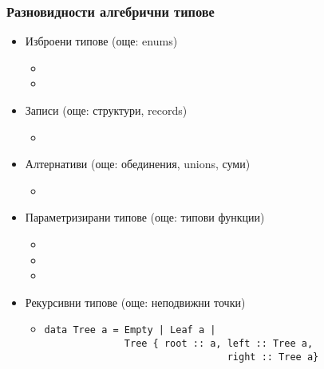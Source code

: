 \documentclass[alsotrans]{beamerswitch}
\begin{document}
\begin{frame}[fragile]
  \frametitle{Разновидности алгебрични типове}
  \small
  \begin{itemize}[<+->]
  \item Изброени типове (още: enums)
    \begin{itemize}
    \item {}
    \item {}
    \end{itemize}
  \item Записи (още: структури, records)
    \begin{itemize}
    \item {}
    \end{itemize}
  \item Алтернативи (още: обединения, unions, суми)
    \begin{itemize}
    \item {}
    \end{itemize}
  \item Параметризирани типове (още: типови функции)
    \begin{itemize}
    \item {}
    \item {}
    \item {}
    \end{itemize}
  \item Рекурсивни типове (още: неподвижни точки)
    \vspace{-1ex}
    \begin{itemize}
    \item
\begin{lstlisting}
data Tree a = Empty | Leaf a |
              Tree { root :: a, left :: Tree a,
                                right :: Tree a}
\end{lstlisting}
    \end{itemize}
  \end{itemize}
\end{frame}
\end{document}
